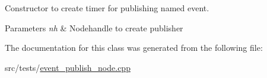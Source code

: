 Constructor to create timer for publishing named event. 


\begin{DoxyParams}{Parameters}
{\em nh} & Nodehandle to create publisher \\
\hline
\end{DoxyParams}


The documentation for this class was generated from the following file\-:\begin{DoxyCompactItemize}
\item 
src/tests/\hyperlink{event__publish__node_8cpp}{event\-\_\-publish\-\_\-node.\-cpp}\end{DoxyCompactItemize}
